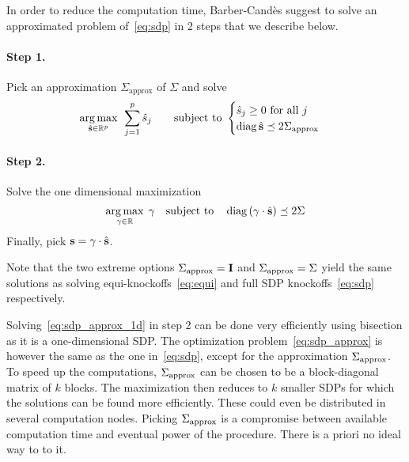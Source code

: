 In order to reduce the computation time,
Barber-Candès suggest to solve an approximated problem of~\ref{eq:sdp} in 2 steps that we describe below.
\paragraph*{Step 1.}
Pick an approximation $\Sigma_\text{approx}$ of $\Sigma$ and solve
\begin{equation}\label{eq:sdp_approx}
    \underset{\hat{\mathbf{s}} \in \mathbb{R}^p}{\operatorname*{arg\,max}}\;\,
    \sum_{j = 1}^p \hat{s}_j
    \qquad
    \text{subject to } \begin{cases}
        \hat{s}_j \geq 0\text{ for all } j\\
        \operatorname*{diag} \hat{\mathbf{s}} \preceq 2\Sigma_\text{approx}
    \end{cases}
\end{equation}
\paragraph*{Step 2.}
Solve the one dimensional maximization
\begin{equation}\label{eq:sdp_approx_1d}
    \underset{\gamma \in \mathbb{R}}{\operatorname*{arg\,max}}\;\,\gamma
    \quad\text{subject to}\quad
    \operatorname*{diag}\left( \gamma \cdot \hat{\mathbf{s}} \right) \preceq 2\Sigma
\end{equation}
Finally, pick $\mathbf{s} = \gamma \cdot \hat{\mathbf{s}}$.

\begin{remark}
    Note that the two extreme options $\Sigma_\text{approx} = \mathbf{I}$ and $\Sigma_\text{approx} = \Sigma$ yield
    the same solutions as solving equi-knockoffs~\ref{eq:equi} and full SDP knockoffs~\ref{eq:sdp} respectively.
\end{remark}

Solving~\ref{eq:sdp_approx_1d} in step 2 can be done very efficiently using bisection as it is a one-dimensional SDP\@.
The optimization problem~\ref{eq:sdp_approx} is however the same as the one in~\ref{eq:sdp},
except for the approximation $\Sigma_\text{approx}$.
To speed up the computations,
$\Sigma_\text{approx}$ can be chosen to be a block-diagonal matrix of $k$ blocks.
The maximization then reduces to $k$ smaller SDPs for which the solutions can be found more efficiently.
These could even be distributed in several computation nodes.
Picking $\Sigma_\text{approx}$ is a compromise between available computation time and eventual power of the procedure.
There is a priori no ideal way to to it.
